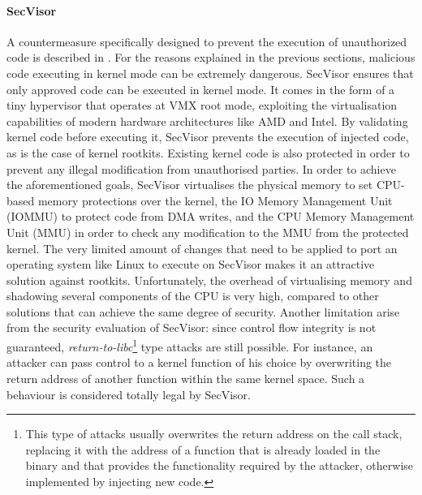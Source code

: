 \paragraph{SecVisor}
A countermeasure specifically designed to prevent the execution of unauthorized code is described in \cite{SecVisor}. For the reasons explained in the previous sections, malicious code executing in kernel mode can be extremely dangerous. SecVisor ensures that only approved code can be executed in kernel mode. It comes in the form of a tiny hypervisor that operates at VMX root mode, exploiting the virtualisation capabilities of modern hardware architectures like AMD and Intel. By validating kernel code before executing it, SecVisor prevents the execution of injected code, as is the case of kernel rootkits. 
Existing kernel code is also protected in order to prevent any illegal modification from unauthorised parties. In order to achieve the aforementioned goals, SecVisor virtualises the physical memory to set CPU-based memory protections over the kernel, the IO Memory Management Unit (IOMMU) to protect code from DMA writes, and the CPU Memory Management Unit (MMU) in order to check any modification to the MMU from the protected kernel. 
The very limited amount of changes that need to be applied to port an operating system like Linux to execute on SecVisor makes it an attractive solution against rootkits. Unfortunately, the overhead of virtualising memory and shadowing several components of the CPU is very high, compared to other solutions that can achieve the same degree of security.
Another limitation arise from the security evaluation of SecVisor: since control flow integrity is not guaranteed, \emph{return-to-libc}\footnote{This type of attacks usually overwrites the return address on the call stack, replacing it with the address of a function that is already loaded in the binary and that provides the functionality required by the attacker, otherwise implemented by injecting new code.}  type attacks are still possible. For instance, an attacker can pass control to a kernel function of his choice by overwriting the return address of another function within the same kernel space. Such a  behaviour is considered totally legal by SecVisor.

